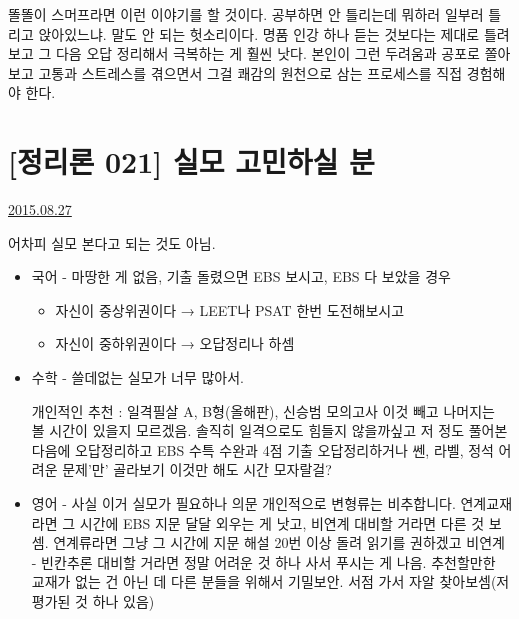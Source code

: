 똘똘이 스머프라면 이런 이야기를 할 것이다. 공부하면 안 틀리는데 뭐하러 일부러 틀리고 앉아있느냐.
말도 안 되는 헛소리이다. 명품 인강 하나 듣는 것보다는 제대로 틀려보고 그 다음 오답 정리해서 극복하는 게 훨씬 낫다.
본인이 그런 두려움과 공포로 쫄아보고 고통과 스트레스를 겪으면서 그걸 쾌감의 원천으로 삼는 프로세스를 직접 경험해야 한다.
\vspace{5mm}








\section{[정리론 021] 실모 고민하실 분}
\href{https://www.kockoc.com/Apoc/276055}{2015.08.27}

\vspace{5mm}

어차피 실모 본다고 되는 것도 아님.
\vspace{5mm}

\begin{itemize}
    
    \item 국어 - 마땅한 게 없음, 기출 돌렸으면 EBS 보시고, EBS 다 보았을 경우
    \begin{itemize}
        \item  자신이 중상위권이다 → LEET나 PSAT 한번 도전해보시고
        \item  자신이 중하위권이다 → 오답정리나 하셈
    \end{itemize}
    
    \item 수학 - 쓸데없는 실모가 너무 많아서.
    

    개인적인 추천 : 일격필살 A, B형(올해판), 신승범 모의고사
    이것 빼고 나머지는 볼 시간이 있을지 모르겠음. 솔직히 일격으로도 힘들지 않을까싶고
    저 정도 풀어본 다음에 오답정리하고 EBS 수특 수완과 4점 기출 오답정리하거나 쎈, 라벨, 정석 어려운 문제'만' 골라보기
    이것만 해도 시간 모자랄걸?
    
    \item 영어 - 사실 이거 실모가 필요하나 의문
    개인적으로 변형류는 비추합니다. 연계교재라면 그 시간에 EBS 지문 달달 외우는 게 낫고, 비연계 대비할 거라면 다른 것 보셈.
    연계류라면 그냥 그 시간에 지문 해설 20번 이상 돌려 읽기를 권하겠고
    비연계 - 빈칸추론 대비할 거라면 정말 어려운 것 하나 사서 푸시는 게 나음.
    추천할만한 교재가 없는 건 아닌 데 다른 분들을 위해서 기밀보안. 서점 가서 자알 찾아보셈(저평가된 것 하나 있음)
\end{itemize}


